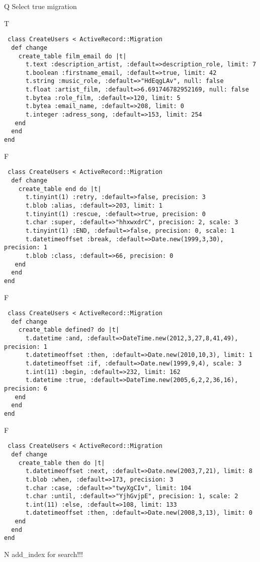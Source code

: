 Q
Select true migration

T
\begin{verbatim}
 class CreateUsers < ActiveRecord::Migration 
  def change 
    create_table film_email do |t| 
      t.text :description_artist, :default=>description_role, limit: 7
      t.boolean :firstname_email, :default=>true, limit: 42
      t.string :music_role, :default=>"HdEqgLAv", null: false
      t.float :artist_film, :default=>6.691746782952169, null: false
      t.bytea :role_film, :default=>120, limit: 5
      t.bytea :email_name, :default=>208, limit: 0
      t.integer :adress_song, :default=>153, limit: 254
   end 
  end 
end
\end{verbatim}

F
\begin{verbatim}
 class CreateUsers < ActiveRecord::Migration 
  def change 
    create_table end do |t| 
      t.tinyint(1) :retry, :default=>false, precision: 3
      t.blob :alias, :default=>203, limit: 1
      t.tinyint(1) :rescue, :default=>true, precision: 0
      t.char :super, :default=>"hhxwxdrC", precision: 2, scale: 3
      t.tinyint(1) :END, :default=>false, precision: 0, scale: 1
      t.datetimeoffset :break, :default=>Date.new(1999,3,30), precision: 1
      t.blob :class, :default=>66, precision: 0
   end 
  end 
end
\end{verbatim}

F
\begin{verbatim}
 class CreateUsers < ActiveRecord::Migration 
  def change 
    create_table defined? do |t| 
      t.datetime :and, :default=>DateTime.new(2012,3,27,8,41,49), precision: 1
      t.datetimeoffset :then, :default=>Date.new(2010,10,3), limit: 1
      t.datetimeoffset :if, :default=>Date.new(1999,9,4), scale: 3
      t.int(11) :begin, :default=>232, limit: 162
      t.datetime :true, :default=>DateTime.new(2005,6,2,2,36,16), precision: 6
   end 
  end 
end
\end{verbatim}

F
\begin{verbatim}
 class CreateUsers < ActiveRecord::Migration 
  def change 
    create_table then do |t| 
      t.datetimeoffset :next, :default=>Date.new(2003,7,21), limit: 8
      t.blob :when, :default=>173, precision: 3
      t.char :case, :default=>"twyXgCIv", limit: 104
      t.char :until, :default=>"YjhGvjpE", precision: 1, scale: 2
      t.int(11) :else, :default=>108, limit: 133
      t.datetimeoffset :then, :default=>Date.new(2008,3,13), limit: 0
   end 
  end 
end
\end{verbatim}
N
add_index for search!!!
  
